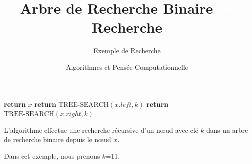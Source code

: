 \documentclass[aspectratio=169, 11pt]{beamer}
\title{Arbre de Recherche Binaire — Recherche}
\subtitle{Exemple de Recherche}
\author{Algorithmes et Pensée Computationnelle \newline \newline  {\small UNIL — École des Sciences Criminelles}}
\date{}
\begin{document}
\begin{frame}
\titlepage
\end{frame}


\begin{frame}
\begin{algorithm}[H]
\caption{TREE-SEARCH($x, k$)}
\begin{algorithmic}[1]
    \State \textbf{return} $x$
\EndIf
{}
    \State \textbf{return} $\text{TREE-SEARCH}(x.left, k)$
\Else
    \State \textbf{return} $\text{TREE-SEARCH}(x.right, k)$
\EndIf
\end{algorithmic}
\end{algorithm}

L'algorithme effectue une recherche récursive d'un nœud avec clé $k$ dans un arbre de recherche binaire depuis le nœud $x$.\newline 

Dans cet exemple, nous prenons $k$=11.

\end{frame}
\end{document}
